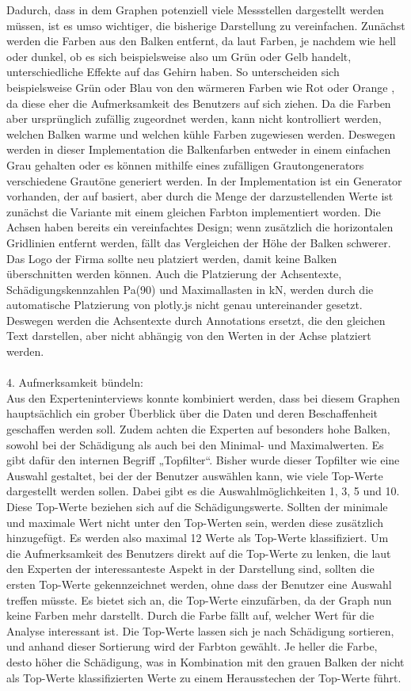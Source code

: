 Dadurch, dass in dem Graphen potenziell viele Messstellen dargestellt werden müssen, ist es umso wichtiger, die bisherige Darstellung zu vereinfachen. Zunächst werden die Farben aus den Balken entfernt, da laut \cite{BO.2019} Farben, je nachdem wie hell oder dunkel, ob es sich beispielsweise also um Grün oder Gelb handelt, unterschiedliche Effekte auf das Gehirn haben. So unterscheiden sich beispielsweise Grün oder Blau von den wärmeren Farben wie Rot oder Orange \cite{BO.2019}, da diese eher die Aufmerksamkeit des Benutzers auf sich ziehen. Da die Farben aber ursprünglich zufällig zugeordnet werden, kann nicht kontrolliert werden, welchen Balken warme und welchen kühle Farben zugewiesen werden. Deswegen werden in dieser Implementation die Balkenfarben entweder in einem einfachen Grau gehalten oder es können mithilfe eines zufälligen Grautongenerators verschiedene Grautöne generiert werden. In der Implementation ist ein Generator vorhanden, der auf \cite{Moob.2017} basiert, aber durch die Menge der darzustellenden Werte ist zunächst die Variante mit einem gleichen Farbton implementiert worden. Die Achsen haben bereits ein vereinfachtes Design; wenn zusätzlich die horizontalen Gridlinien entfernt werden, fällt das Vergleichen der Höhe der Balken schwerer. Das Logo der Firma sollte neu platziert werden, damit keine Balken überschnitten werden können. Auch die Platzierung der Achsentexte, \glqq Schädigungskennzahlen Pa(90)\grqq{} und \glqq Maximallasten in kN\grqq{}, werden durch die automatische Platzierung von plotly.js nicht genau untereinander gesetzt. Deswegen werden die Achsentexte durch Annotations ersetzt, die den gleichen Text darstellen, aber nicht abhängig von den Werten in der Achse platziert werden.\\\\
4. Aufmerksamkeit bündeln:\\
Aus den Experteninterviews konnte kombiniert werden, dass bei diesem Graphen hauptsächlich ein grober Überblick über die Daten und deren Beschaffenheit geschaffen werden soll. Zudem achten die Experten auf besonders hohe Balken, sowohl bei der Schädigung als auch bei den Minimal- und Maximalwerten. Es gibt dafür den internen Begriff „Topfilter“. Bisher wurde dieser Topfilter wie eine Auswahl gestaltet, bei der der Benutzer auswählen kann, wie viele Top-Werte dargestellt werden sollen. Dabei gibt es die Auswahlmöglichkeiten 1, 3, 5 und 10. Diese Top-Werte beziehen sich auf die Schädigungswerte. Sollten der  minimale und maximale Wert nicht unter den Top-Werten sein, werden diese zusätzlich hinzugefügt. Es werden also maximal 12 Werte als Top-Werte klassifiziert. Um die Aufmerksamkeit des Benutzers direkt auf die Top-Werte zu lenken, die laut den Experten der interessanteste Aspekt in der Darstellung sind, sollten die ersten Top-Werte gekennzeichnet werden, ohne dass der Benutzer eine Auswahl treffen müsste. Es bietet sich an, die Top-Werte einzufärben, da der Graph nun keine Farben mehr darstellt. Durch die Farbe fällt auf, welcher Wert für die Analyse interessant ist. Die Top-Werte lassen sich je nach Schädigung sortieren, und anhand dieser Sortierung wird der Farbton gewählt. Je heller die Farbe, desto höher die Schädigung, was in Kombination mit den grauen Balken der nicht als Top-Werte klassifizierten Werte zu einem Herausstechen der Top-Werte führt.
